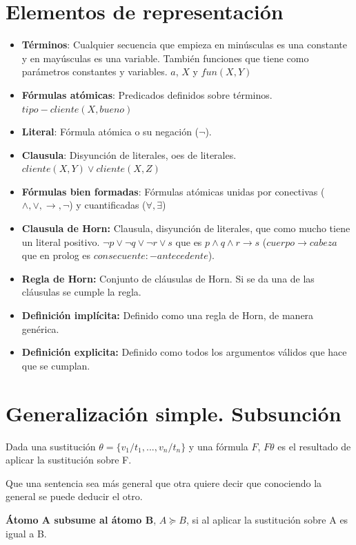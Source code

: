 \documentclass[12pt, twoside, openright]{report} %
\begin{document}
\section{Elementos de representación}
\begin{itemize}
  \item \textbf{Términos}: Cualquier secuencia que empieza en minúsculas es una constante y en mayúsculas es una variable. También funciones que tiene como parámetros constantes y variables. $a$, $X$ y $fun(X,Y)$
  \item \textbf{Fórmulas atómicas}: Predicados definidos sobre términos. $tipo-cliente(X, bueno)$
  \item \textbf{Literal}: Fórmula atómica o su negación ($\neg$).
  \item \textbf{Clausula}: Disyunción de literales, oes de literales. $cliente(X,Y)\vee cliente(X,Z)$
  \item \textbf{Fórmulas bien formadas}: Fórmulas atómicas unidas por conectivas ($\wedge, \vee, \rightarrow, \neg$) y cuantificadas ($\forall, \exists$)
  \item \textbf{Clausula de Horn:} Clausula, disyunción de literales, que como mucho tiene un literal positivo. $\neg p \vee \neg q \vee \neg r \vee s$ que es $p \wedge q \wedge r \rightarrow s$ ($cuerpo \rightarrow cabeza$ que en prolog es $consecuente:-antecedente$).
  \item \textbf{Regla de Horn:} Conjunto de cláusulas de Horn. Si se da una de las cláusulas se cumple la regla.
  \item \textbf{Definición implícita:} Definido como una regla de Horn, de manera genérica.
  \item \textbf{Definición explicita:} Definido como todos los argumentos válidos que hace que se cumplan.
\end{itemize}

\section{Generalización simple. Subsunción}
Dada una sustitución $\theta= \{v_1/t_1, . . . , v_n/t_n\}$ y una fórmula $F$, $F\theta$ es el resultado de aplicar la sustitución sobre F.

Que una sentencia sea más general que otra quiere decir que conociendo la general se puede deducir el otro.

\textbf{Átomo A subsume al átomo B}, $A \succeq B$, si al aplicar la sustitución sobre A es igual a B.
\end{document}
